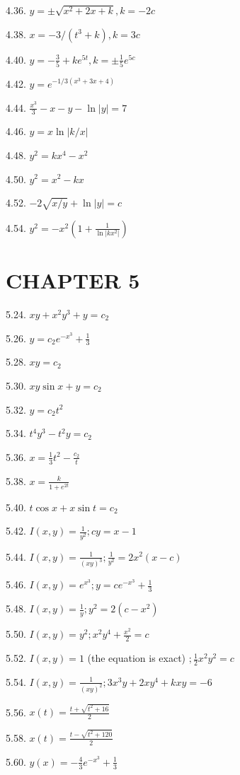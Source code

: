 \documentclass[10pt]{article}
\begin{document}
4.36. $y= \pm \sqrt{x^{2}+2 x+k}, k=-2 c$

4.38. $x=-3 /\left(t^{3}+k\right), k=3 c$

4.40. $y=-\frac{3}{5}+k e^{5 t}, k= \pm \frac{1}{5} e^{5 c}$

4.42. $y=e^{-1 / 3\left(x^{3}+3 x+4\right)}$

4.44. $\frac{x^{3}}{3}-x-y-\ln |y|=7$

4.46. $y=x \ln |k / x|$

4.48. $y^{2}=k x^{4}-x^{2}$

4.50. $y^{2}=x^{2}-k x$

4.52. $-2 \sqrt{x / y}+\ln |y|=c$

4.54. $y^{2}=-x^{2}\left(1+\frac{1}{\ln \left|k x^{2}\right|}\right)$

\section*{CHAPTER 5}
5.24. $x y+x^{2} y^{3}+y=c_{2}$

5.26. $y=c_{2} e^{-x^{3}}+\frac{1}{3}$

5.28. $x y=c_{2}$

5.30. $x y \sin x+y=c_{2}$

5.32. $y=c_{2} t^{2}$

5.34. $t^{4} y^{3}-t^{2} y=c_{2}$

5.36. $x=\frac{1}{3} t^{2}-\frac{c_{2}}{t}$

5.38. $x=\frac{k}{1+e^{2 t}}$

5.40. $t \cos x+x \sin t=c_{2}$

5.42. $I(x, y)=\frac{1}{y^{2}} ; c y=x-1$

5.44. $I(x, y)=\frac{1}{(x y)^{3}} ; \frac{1}{y^{2}}=2 x^{2}(x-c)$

5.46. $I(x, y)=e^{x^{3}} ; y=c e^{-x^{3}}+\frac{1}{3}$

5.48. $I(x, y)=\frac{1}{y} ; y^{2}=2\left(c-x^{2}\right)$

5.50. $I(x, y)=y^{2} ; x^{2} y^{4}+\frac{x^{2}}{2}=c$

5.52. $I(x, y)=1$ (the equation is exact) $; \frac{1}{2} x^{2} y^{2}=c$

5.54. $I(x, y)=\frac{1}{(x y)^{2}} ; 3 x^{3} y+2 x y^{4}+k x y=-6$

5.56. $x(t)=\frac{t+\sqrt{t^{2}+16}}{2}$

5.58. $x(t)=\frac{t-\sqrt{t^{2}+120}}{2}$

5.60. $y(x)=-\frac{4}{3} e^{-x^{3}}+\frac{1}{3}$
\end{document}
